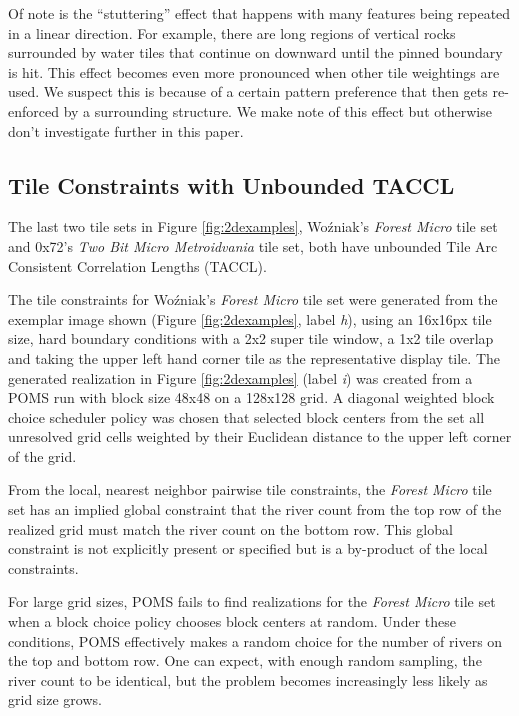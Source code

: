 Of note is the ``stuttering'' effect that happens with many features being repeated in a linear direction.
For example, there are long regions of vertical rocks surrounded by water tiles that continue on downward until the
pinned boundary is hit.
This effect becomes even more pronounced when other tile weightings are used.
We suspect this is because of a certain pattern preference that then gets re-enforced
by a surrounding structure.
We make note of this effect but otherwise don't investigate further in this paper.

\subsection{Tile Constraints with Unbounded TACCL}

The last two tile sets in Figure \ref{fig:2dexamples}, Wo\'zniak's \textit{Forest Micro} tile set and 0x72's \textit{Two Bit Micro Metroidvania} tile set,
both have unbounded Tile Arc Consistent Correlation Lengths (TACCL).

The tile constraints for Wo\'zniak's \textit{Forest Micro} tile set were generated from the exemplar image shown (Figure \ref{fig:2dexamples}, label \textit{h}), using
an 16x16px tile size, hard boundary conditions with a 2x2 super tile window, a 1x2 tile overlap and taking the upper left hand corner tile as the representative
display tile.
The generated realization in Figure \ref{fig:2dexamples} (label \textit{i}) was created from a POMS run with block size 48x48 on a 128x128 grid.
A diagonal weighted block choice scheduler policy was chosen that selected block centers from the set all unresolved grid cells weighted by their Euclidean distance
to the upper left corner of the grid.

From the local, nearest neighbor pairwise tile constraints,
the \textit{Forest Micro} tile set has an implied global constraint that the river count from the top row of the realized
grid must match the river count on the bottom row.
This global constraint is not explicitly present or specified but is a by-product of the local constraints.

For large grid sizes, POMS fails to find realizations for the \textit{Forest Micro} tile set when a block
choice policy chooses block centers at random.
Under these conditions, POMS effectively makes a random choice for the number of rivers on the top and bottom row.
One can expect, with enough random sampling, the river count to be identical, but the problem
becomes increasingly less likely as grid size grows.

